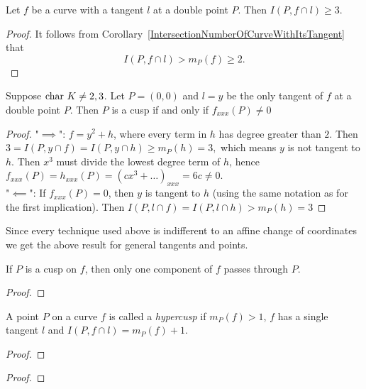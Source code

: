     \begin{lemma}
        Let $f$ be a curve with a tangent $l$ at a double point $P$. Then $I(P,f\cap l)\geq 3$.
    \end{lemma}
    \begin{proof}
        It follows from Corollary~\ref{IntersectionNumberOfCurveWithItsTangent} that
        $$I(P,f\cap l)> m_P(f) \geq 2.$$
    \end{proof}
    \begin{lemma}\label{CuspsAndPartialDerivatives}
        Suppose
        $\mathrm{char}\ K \neq 2,3$. Let $P=(0,0)$ and $l=y$ be the only tangent of $f$ at a double point $P$. Then $P$ is a cusp if and only if $f_{xxx}(P)\neq 0$
    \end{lemma}
    \begin{proof}
        "$\implies$": $f=y^2+h$, where every term in $h$ has degree greater than $2$. Then $3=I(P,y\cap f)=I(P,y\cap h)\geq m_P(h)=3,$ 
        which means $y$ is not tangent to $h$. Then $x^3$ must divide the lowest degree term of $h$, hence $f_{xxx}(P)=h_{xxx}(P)=(cx^3+\dots)_{xxx}=6c\neq 0.$\\
        "$\impliedby$": If $f_{xxx}(P)=0$, then $y$ is tangent to $h$ (using the same notation as for the first implication). Then $I(P,l\cap f)=I(P,l\cap h)>m_P(h)=3$
    \end{proof}
    \begin{remark}
        Since every technique used above is indifferent to an affine change of coordinates we get the above result for general tangents and points.  
    \end{remark}
    \begin{proposition}
        If $P$ is a cusp on $f$, then only one component of $f$ passes through $P$.  
    \end{proposition}
    \begin{proof}
        
    \end{proof}
    \begin{definition}
        A point $P$ on a curve $f$ is called a \textit{hypercusp} if $m_P(f)>1$, $f$ has a single tangent $l$ and $I(P,f\cap l)=m_P(f)+1$.
    \end{definition}
    \begin{lemma}
        
    \end{lemma}
    \begin{proof}
        
    \end{proof}
    \begin{proposition}
        
    \end{proposition}
    \begin{proof}
        
    \end{proof}
